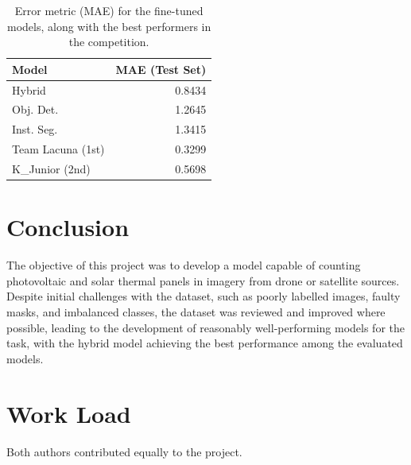 \documentclass[conference]{IEEEtran}
\begin{document}
\begin{table}[H]
\centering
\caption{Error metric (MAE) for the fine-tuned models, along with the best performers in the competition.}
\label{tab:model02_results_transposed}
\begin{tabular}{lr}
\toprule
\textbf{Model} & \textbf{MAE (Test Set)} \\
\midrule
Hybrid & 0.8434 \\
Obj. Det. & 1.2645 \\
Inst. Seg. & 1.3415 \\
Team Lacuna (1st) & 0.3299 \\
K\_Junior (2nd) & 0.5698 \\
\bottomrule
\end{tabular}
\end{table}




\section{Conclusion}

The objective of this project was to develop a model capable of counting photovoltaic and solar thermal panels in imagery from drone or satellite sources. Despite initial challenges with the dataset, such as poorly labelled images, faulty masks, and imbalanced classes, the dataset was reviewed and improved where possible, leading to the development of reasonably well-performing models for the task, with the hybrid model achieving the best performance among the evaluated models.


\section*{Work Load}

Both authors contributed equally to the project.



\end{document}
